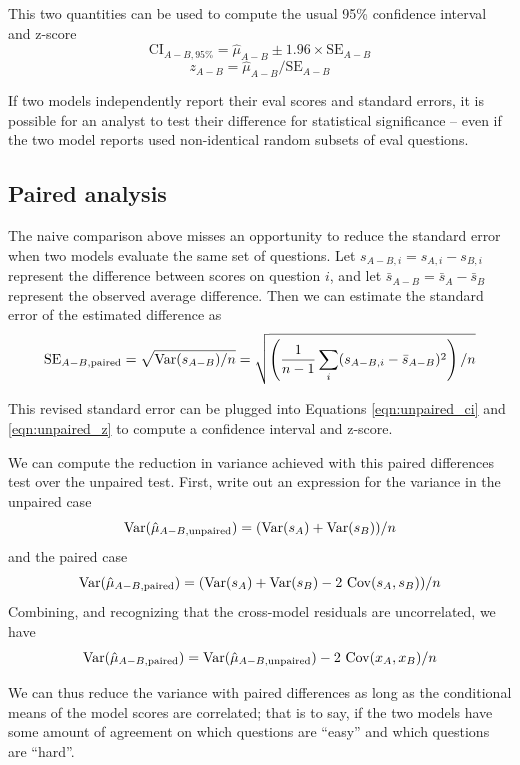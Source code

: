 \documentclass[11pt, oneside]{article}   	%
\newcommand{\Var}{\mathrm{Var}}
\newcommand{\Cov}{\mathrm{Cov}}
\newcommand{\standarderror}{\mathrm{SE}}
\newcommand{\confidenceinterval}{\mathrm{CI}}
\begin{document}
This two quantities can be used to compute the usual 95\% confidence interval and z-score
\begin{equation}
\label{eqn:unpaired_ci}
\confidenceinterval_{A-B, 95\%}=\hat{\mu}_{A-B} \pm 1.96 \times \standarderror_{A-B}
\end{equation}
\begin{equation}
\label{eqn:unpaired_z}
z_{A-B}=\hat{\mu}_{A-B}/\standarderror_{A-B}
\end{equation}

If two models independently report their eval scores and standard errors, it is possible for an analyst to test their difference for statistical significance -- even if the two model reports used non-identical random subsets of eval questions.

\subsection{Paired analysis}
\label{sec:paired}

The naive comparison above misses an opportunity to reduce the standard error when two models evaluate the same set of questions. Let $s_{A-B, i}=s_{A, i}-s_{B, i}$ represent the difference between scores on question $i$, and let $\bar{s}_{A-B}=\bar{s}_A-\bar{s}_B$ represent the observed average difference. Then we can estimate the standard error of the estimated difference as
\begin{equation}
\standarderror_{A-B, {\rm paired}} = \sqrt{\Var(s_{A-B})/n} = \sqrt{\left(\frac{1}{n-1}\sum_i (s_{A-B, i}-\bar{s}_{A-B})^2\right)/n}
\end{equation}

This revised standard error can be plugged into Equations \ref{eqn:unpaired_ci} and \ref{eqn:unpaired_z} to compute a confidence interval and z-score.

We can compute the reduction in variance achieved with this paired differences test over the unpaired test. First, write out an expression for the variance in the unpaired case
\[
\Var(\hat{\mu}_{A-B, {\rm unpaired}})=(\Var(s_A)+\Var(s_B))/n
\]
and the paired case
\[
\Var(\hat{\mu}_{A-B, {\rm paired}})=(\Var(s_A)+\Var(s_B)-2\ \Cov(s_A, s_B))/n
\]
Combining, and recognizing that the cross-model residuals are uncorrelated, we have
\[
\Var(\hat{\mu}_{A-B, {\rm paired}})=\Var(\hat{\mu}_{A-B, {\rm unpaired}})-2\ \Cov(x_A, x_B)/n
\]

We can thus reduce the variance with paired differences as long as the conditional means of the model scores are correlated; that is to say, if the two models have some amount of agreement on which questions are ``easy'' and which questions are ``hard''.
\end{document}
